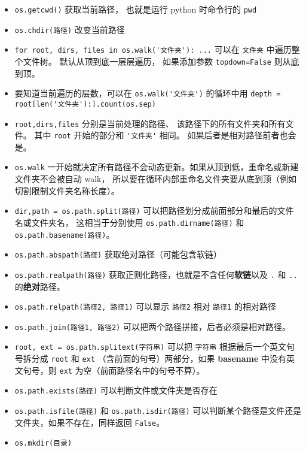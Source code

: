 
\begin{issues}
\issueDraft
\end{issues}

\begin{itemize}
\item \verb`os.getcwd()` 获取当前路径， 也就是运行 python 时命令行的 \verb`pwd`
\item \verb`os.chdir(路径)` 改变当前路径 
\item \verb`for root, dirs, files in os.walk('文件夹'): ...` 可以在 \verb`文件夹` 中遍历整个文件树。 默认从顶到底一层层遍历， 如果添加参数 \verb`topdown=False` 则从底到顶。
\item 要知道当前遍历的层数，可以在 \verb`os.walk('文件夹')` 的循环中用 \verb`depth = root[len('文件夹'):].count(os.sep)`
\item \verb`root,dirs,files` 分别是当前处理的路径、 该路径下的所有文件夹和所有文件。 其中 \verb`root` 开始的部分和 \verb`'文件夹'` 相同。 如果后者是相对路径前者也会是。
\item \verb`os.walk` 一开始就决定所有路径不会动态更新。如果从顶到低，重命名或新建文件夹不会被自动 walk， 所以要在循环内部重命名文件夹要从底到顶（例如切割限制文件夹名称长度）。
\item \verb`dir,path = os.path.split(路径)` 可以把路径划分成前面部分和最后的文件名或文件夹名， 这相当于分别使用 \verb`os.path.dirname(路径)` 和 \verb`os.path.basename(路径)`。
\item \verb`os.path.abspath(路径)` 获取绝对路径（可能包含软链）
\item \verb`os.path.realpath(路径)` 获取正则化路径，也就是不含任何\textbf{软链}以及 \verb`.` 和 \verb`..` 的\textbf{绝对}路径。
\item \verb`os.path.relpath(路径2, 路径1)` 可以显示 \verb`路径2` 相对 \verb`路径1` 的相对路径
\item \verb`os.path.join(路径1, 路径2)` 可以把两个路径拼接，后者必须是相对路径。
\item \verb`root, ext = os.path.splitext(字符串)` 可以把 \verb`字符串` 根据最后一个英文句号拆分成 \verb`root` 和 \verb`ext` （含前面的句号）两部分，如果 \textbf{basename} 中没有英文句号，则 \verb`ext` 为空（前面路径名中的句号不算）。
\item \verb`os.path.exists(路径)` 可以判断文件或文件夹是否存在
\item \verb`os.path.isfile(路径)` 和 \verb`os.path.isdir(路径)` 可以判断某个路径是文件还是文件夹，如果不存在，同样返回 \verb`False`。
\item \verb`os.mkdir(目录)`
\end{itemize}
